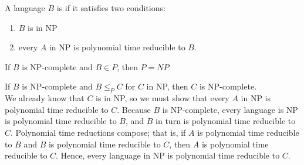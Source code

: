 \documentclass{article}
\begin{document}
\begin{definition}[NP-Completeness]
  A language $B$ is  if it satisfies two conditions: 
  \begin{enumerate}
    \item $B$ is in NP 
    \item every $A$ in NP is polynomial time reducible to $B$. 
  \end{enumerate}
\end{definition}

\begin{theorem}
  If $B$ is NP-complete and $B \in P$, then $P = NP$
\end{theorem}

\begin{theorem}
  If $B$ is NP-complete and $B \leq_{P} C$ for $C$ in NP, then $C$ is NP-complete. \\ 
   We already know that $C$ is in NP, so we must show that every $A$ in NP is polynomial time reducible to $C$. Because $B$ is NP-complete, every language is NP is polynomial time reducible to $B$, and $B$ in turn is polynomial time reducible to $C$. Polynomial time reductions compose; that is, if $A$ is polynomial time reducible to $B$ and $B$ is polynomial time reducible to $C$, then $A$ is polynomial time reducible to $C$. Hence, every language in NP is polynomial time reducible to $C$. 
\end{theorem}
\end{document}
